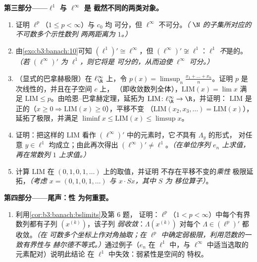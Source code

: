 \begin{problem}[{周末问题——$(\ell^p)' = \ell^q$，
自反性，以及 $\ell^\infty$ 的奇异性}]
\medskip
\noindent\textbf{第三部分——$\ell^1$ 与 $\ell^\infty$ 是
截然不同的两类对象。}
\begin{enumerate}[resume]
  \item 证明 $\ell^p$（$1 \leq p < \infty$）与 $c_0$ 均
        可分，但 $\ell^\infty$ 不可分。\emph{（
        $\N$ 的子集所对应的不可数多个示性数列
        两两距离为 $1$。）}
  \item 由\cref{exo:b3:banach:10}可知 $(\ell^1)'
        \cong \ell^\infty$，但 $(\ell^\infty)' \not\cong
        \ell^1$：$\ell^1$ \emph{不}是的。
        \emph{（若 $(\ell^\infty)'$ 为 $\ell^1$，则它将是
        可分的，从而迫使 $\ell^\infty$ 可分。）}
  \item （显式的巴拿赫极限）在 $\ell^\infty_\R$ 上，令
        $p(x) = \limsup_n \frac{x_1 + \dots + x_n}{n}$。证明
        $p$ 是次线性的，并且在子空间 $c$ 上，
        （即收敛数列全体），$\mathrm{LIM}(x) = \lim x$
        满足 $\mathrm{LIM} \leq p$。由哈恩–巴拿赫定理，延拓为
        $\mathrm{LIM} \colon \ell^\infty_\R \to \R$，并证明：
        $\mathrm{LIM}$ 是正的（$x \geq 0 \Rightarrow
        \mathrm{LIM}(x) \geq 0$），平移不变
        （$\mathrm{LIM}(x_2, x_3, \dots) = \mathrm{LIM}(x)$），
        延拓了极限，并满足 $\liminf x \leq
        \mathrm{LIM}(x)\leq \limsup x$。
  \item 证明：把这样的 $\mathrm{LIM}$ 看作
        $(\ell^\infty)'$ 中的元素时，它\emph{不}具有 $\Lambda_y$ 的形式，
        对任意 $y \in \ell^1$ 均成立；由此再次得出 $(\ell^\infty)'
        \neq \ell^1$。\emph{（在单位序列
        $e_n$ 上求值，再在常数列 $1$ 上求值。）}
  \item 计算 $\mathrm{LIM}$ 在 $(0,1,0,1,\dots)$ 上的取值，并证明
        不存在平移不变的\emph{乘性}
        极限延拓，\emph{（考虑 $x =
        (0,1,0,1,\dots)$ 与 $x\cdot Sx$，其中 $S$ 为
        移位算子）}。
\end{enumerate}

\medskip
\noindent\textbf{第四部分——尾声：性
为何重要。}
\begin{enumerate}[resume]
  \item 利用\cref{cor:b3:banach:bslimits}及第 6 题，
        证明：$\ell^p$（$1 < p <
        \infty$）中每个有界数列都有子列 $(x^{(k)})$，该子列
        \emph{弱收敛}：$\Lambda(x^{(k)})$ 对每个
        $\Lambda \in (\ell^p)'$ 都收敛。\emph{（在
        可数多个坐标上作对角抽取；在
        $\ell^p$ 中确定弱极限，利用范数的一致有界性与
        赫尔德不等式。）}通过例子（$e_n$ 在 $\ell^1$ 中，与
        $\ell^\infty$ 中适当选取的元素配对）说明此结论
        在 $\ell^1$ 中失效：弱紧性是空间的
        特权。
\end{enumerate}


\end{problem}
